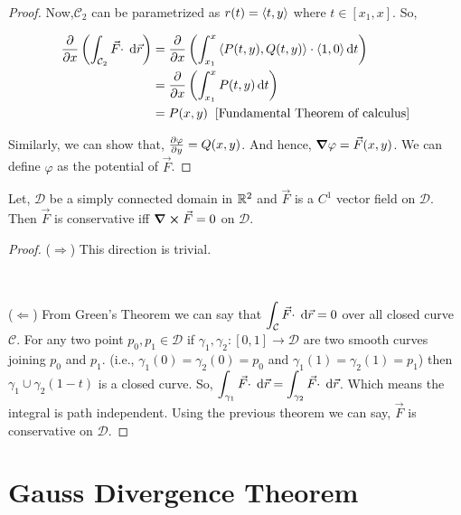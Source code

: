 \documentclass[../Analysis-3]{subfiles}
\begin{document}
\begin{proof}
    Now,$\mathcal{C}_2$ can be parametrized as $r(t) = \left\langle {t}, {y} \right\rangle$ where $t \in [x_1,x]$. So,

    \begin{align*}
        \pdv{x} \left(\int_{\mathcal{C}_2} {\vec{F} \cdot } \hspace{0.1cm} \dd {\vec{r}}\right) & = \pdv{x} \left( \int_{x_1}^x \left\langle {P(t,y)}, {Q(t,y)} \right\rangle \cdot \left\langle {1}, {0} \right\rangle \dd{t} \right) \\
                                                                           & = \pdv{x} \left( \int_{x_1}^x P(t,y) \dd{t} \right)                                \\
                                                                           & = P(x,y) \hspace{0.2cm} \text{[Fundamental Theorem of calculus]}
    \end{align*}

    Similarly, we can show that, $\pdv{\varphi}{y} = Q(x,y)$. And hence, $\grad\varphi = \vec{F}(x,y)$. We can define $\varphi$ as the potential of $\vec{F}$.
\end{proof}

\begin{Thm}{}{}
    Let, $\mathcal{D}$ be a simply connected domain in $\mathbb{R}^2$ and $\vec{F}$ is a $C^1$ vector field on $\mathcal{D}$. Then $\vec{F}$ is conservative iff $\curl \vec{F} = 0$ on $\mathcal{D}$.
\end{Thm}

\begin{proof}
    ($\Rightarrow$) This direction is trivial.

    \

    ($\Leftarrow$) From Green's Theorem we can say that $ \displaystyle\int_{\mathcal{C}} {\vec{F} \cdot } \hspace{0.1cm} \dd {\vec{r}} = 0$ over all closed curve $\mathcal{C}$. For any two point $p_0,p_1 \in \mathcal{D}$ if $\gamma_1, \gamma_2 : [0,1] \to \mathcal{D}$ are two smooth curves joining $p_0$ and $p_1$. (i.e., $\gamma_1(0) = \gamma_2 (0) = p_0$ and $\gamma_1(1) = \gamma_2(1) = p_1$) then $\gamma_1 \cup \gamma_2(1-t)$ is a closed curve. So, $ \displaystyle\int_{\gamma_1} {\vec{F} \cdot } \hspace{0.1cm} \dd {\vec{r}}  = \displaystyle\int_{\gamma_2} {\vec{F} \cdot } \hspace{0.1cm} \dd {\vec{r}}$. Which means the integral is path independent. Using the previous theorem we can say, $\vec{F}$ is conservative on $\mathcal{D}$.
\end{proof}

\section{Gauss Divergence Theorem}
\end{document}
